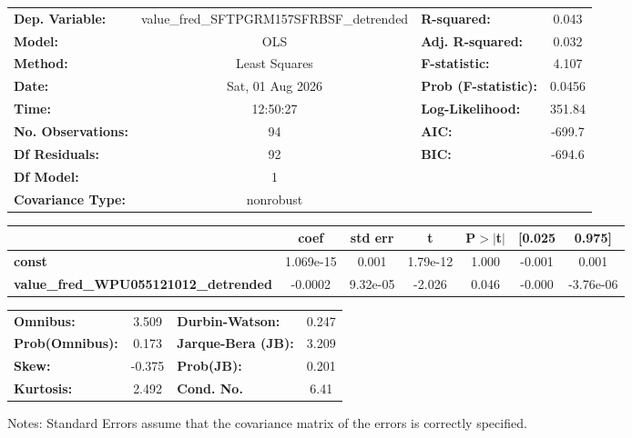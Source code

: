 \begin{center}
\begin{tabular}{lclc}
\toprule
\textbf{Dep. Variable:}                       & value\_fred\_SFTPGRM157SFRBSF\_detrended & \textbf{  R-squared:         } &     0.043   \\
\textbf{Model:}                               &                   OLS                    & \textbf{  Adj. R-squared:    } &     0.032   \\
\textbf{Method:}                              &              Least Squares               & \textbf{  F-statistic:       } &     4.107   \\
\textbf{Date:}                                &             Sat, 01 Aug 2026             & \textbf{  Prob (F-statistic):} &   0.0456    \\
\textbf{Time:}                                &                 12:50:27                 & \textbf{  Log-Likelihood:    } &    351.84   \\
\textbf{No. Observations:}                    &                      94                  & \textbf{  AIC:               } &    -699.7   \\
\textbf{Df Residuals:}                        &                      92                  & \textbf{  BIC:               } &    -694.6   \\
\textbf{Df Model:}                            &                       1                  & \textbf{                     } &             \\
\textbf{Covariance Type:}                     &                nonrobust                 & \textbf{                     } &             \\
\bottomrule
\end{tabular}
\begin{tabular}{lcccccc}
                                              & \textbf{coef} & \textbf{std err} & \textbf{t} & \textbf{P$> |$t$|$} & \textbf{[0.025} & \textbf{0.975]}  \\
\midrule
\textbf{const}                                &    1.069e-15  &        0.001     &  1.79e-12  &         1.000        &       -0.001    &        0.001     \\
\textbf{value\_fred\_WPU055121012\_detrended} &      -0.0002  &     9.32e-05     &    -2.026  &         0.046        &       -0.000    &    -3.76e-06     \\
\bottomrule
\end{tabular}
\begin{tabular}{lclc}
\textbf{Omnibus:}       &  3.509 & \textbf{  Durbin-Watson:     } &    0.247  \\
\textbf{Prob(Omnibus):} &  0.173 & \textbf{  Jarque-Bera (JB):  } &    3.209  \\
\textbf{Skew:}          & -0.375 & \textbf{  Prob(JB):          } &    0.201  \\
\textbf{Kurtosis:}      &  2.492 & \textbf{  Cond. No.          } &     6.41  \\
\bottomrule
\end{tabular}
\end{center}

Notes: \newline
 [1] Standard Errors assume that the covariance matrix of the errors is correctly specified.